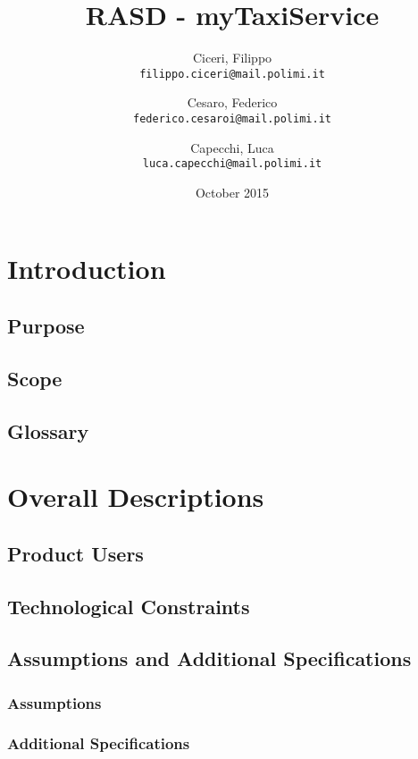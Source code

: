 \documentclass[12pt,a4paper,titlepage]{report}
\title{RASD - myTaxiService}
\author{
	Ciceri, Filippo \\
	\texttt{filippo.ciceri@mail.polimi.it}
	\and
	Cesaro, Federico \\
	\texttt{federico.cesaroi@mail.polimi.it}
	\and
	Capecchi, Luca \\
	\texttt{luca.capecchi@mail.polimi.it}
}
\date{October 2015}
\begin{document}
\maketitle
\tableofcontents
\newpage


   \chapter{Introduction}

   \section{Purpose}
   
   \section{Scope}
   
   \section{Glossary}


   \chapter{Overall Descriptions}
   \section{Product Users}
   
   \section{Technological Constraints}
   
   \section{Assumptions and Additional Specifications}

   \subsection{Assumptions}

   \subsection{Additional Specifications}
\end{document}
